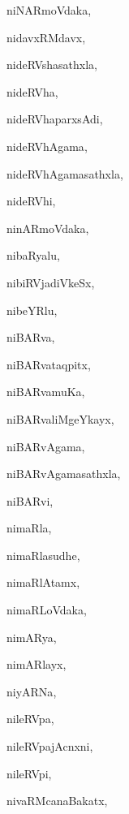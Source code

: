 \begin{multicols}{3}
{\noindent
{niNARmoVdaka}, \pageref{niNARmoVdaka}

\noindent
{nidavxRMdavx}, \pageref{nidavxRMdavx}

\noindent
{nideRVshasathxla}, \pageref{nideRVshasathxla}

\noindent
{nideRVha}, \pageref{nideRVha}

\noindent
{nideRVhaparxsAdi}, \pageref{nideRVhaparxsAdi}

\noindent
{nideRVhAgama}, \pageref{nideRVhAgama}

\noindent
{nideRVhAgamasathxla}, \pageref{nideRVhAgamasathxla}

\noindent
{nideRVhi}, \pageref{nideRVhi}

\noindent
{ninARmoVdaka}, \pageref{ninARmoVdaka}

\noindent
{nibaRyalu}, \pageref{nibaRyalu}

\noindent
{nibiRVjadiVkeSx}, \pageref{nibiRVjadiVkeSx}

\noindent
{nibeYRlu}, \pageref{nibeYRlu}

\noindent
{niBARva}, \pageref{niBARva}

\noindent
{niBARvataqpitx}, \pageref{niBARvataqpitx}

\noindent
{niBARvamuKa}, \pageref{niBARvamuKa}

\noindent
{niBARvaliMgeYkayx}, \pageref{niBARvaliMgeYkayx}

\noindent
{niBARvAgama}, \pageref{niBARvAgama}

\noindent
{niBARvAgamasathxla}, \pageref{niBARvAgamasathxla}

\noindent
{niBARvi}, \pageref{niBARvi}

\noindent
{nimaRla}, \pageref{nimaRla}

\noindent
{nimaRlasudhe}, \pageref{nimaRlasudhe}

\noindent
{nimaRlAtamx}, \pageref{nimaRlAtamx}

\noindent
{nimaRLoVdaka}, \pageref{nimaRLoVdaka}

\noindent
{nimARya}, \pageref{nimARya}

\noindent
{nimARlayx}, \pageref{nimARlayx}

\noindent
{niyARNa}, \pageref{niyARNa}

\noindent
{nileRVpa}, \pageref{nileRVpa}

\noindent
{nileRVpajAcnxni}, \pageref{nileRVpajAcnxni}

\noindent
{nileRVpi}, \pageref{nileRVpi}

\noindent
{nivaRMcanaBakatx}, \pageref{nivaRMcanaBakatx}

}
\end{multicols}
